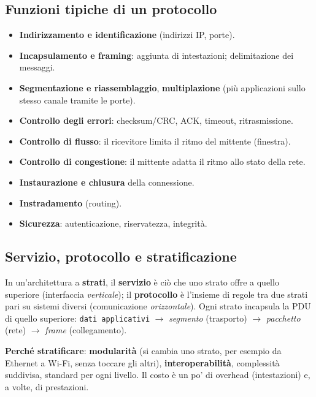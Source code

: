\subsection{Funzioni tipiche di un protocollo}
\begin{itemize}
    \item \textbf{Indirizzamento e identificazione} (indirizzi IP, porte).
    \item \textbf{Incapsulamento e framing}: aggiunta di intestazioni; delimitazione dei messaggi.
    \item \textbf{Segmentazione e riassemblaggio}, \textbf{multiplazione} (più applicazioni sullo stesso canale tramite le porte).
    \item \textbf{Controllo degli errori}: checksum/CRC, ACK, timeout, ritrasmissione.
    \item \textbf{Controllo di flusso}: il ricevitore limita il ritmo del mittente (finestra).
    \item \textbf{Controllo di congestione}: il mittente adatta il ritmo allo stato della rete.
    \item \textbf{Instaurazione e chiusura} della connessione.
    \item \textbf{Instradamento} (routing).
    \item \textbf{Sicurezza}: autenticazione, riservatezza, integrità.
\end{itemize}

\subsection{Servizio, protocollo e stratificazione}
In un'architettura a \textbf{strati}, il \textbf{servizio} è ciò che uno strato offre a quello superiore (interfaccia \emph{verticale}); il \textbf{protocollo} è l'insieme di regole tra due strati pari su sistemi diversi (comunicazione \emph{orizzontale}). Ogni strato incapsula la PDU di quello superiore: \texttt{dati applicativi} $\to$ \emph{segmento} (trasporto) $\to$ \emph{pacchetto} (rete) $\to$ \emph{frame} (collegamento).

\textbf{Perché stratificare}: \textbf{modularità} (si cambia uno strato, per esempio da Ethernet a Wi-Fi, senza toccare gli altri), \textbf{interoperabilità}, complessità suddivisa, standard per ogni livello. Il costo è un po' di overhead (intestazioni) e, a volte, di prestazioni.

